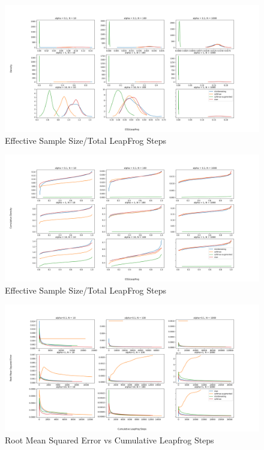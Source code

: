 \documentclass[11pt]{article}
\begin{document}
\begin{figure}
    \centering
    \includegraphics[width=1.2\textwidth]{figures/simplex/ess_density.png}
    \caption{Effective Sample Size/Total LeapFrog Steps}
    \label{fig:ess_density}
\end{figure}

\begin{figure}
    \centering
    \includegraphics[width=1.2\textwidth]{figures/simplex/ess_cdf.png}
    \caption{Effective Sample Size/Total LeapFrog Steps}
    \label{fig:ess_cdf}
\end{figure}

\begin{figure}
    \centering
    \includegraphics[width=1.2\textwidth]{figures/simplex/rmse.png}
    \caption{Root Mean Squared Error vs Cumulative Leapfrog Steps}
    \label{fig:rmse}
\end{figure}
\end{document}
